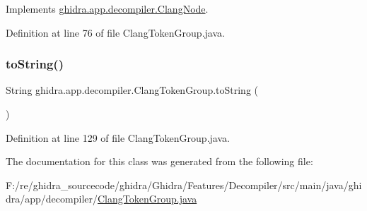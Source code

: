 Implements \mbox{\hyperlink{interfaceghidra_1_1app_1_1decompiler_1_1_clang_node_a4c8a1dc76211ce497441c58554675f55}{ghidra.\+app.\+decompiler.\+Clang\+Node}}.



Definition at line 76 of file Clang\+Token\+Group.\+java.

\mbox{\label{classghidra_1_1app_1_1decompiler_1_1_clang_token_group_a3aac53106263a74cda840c5bea1be90f}} 
\subsubsection{\texorpdfstring{toString()}{toString()}}
{\footnotesize\ttfamily String ghidra.\+app.\+decompiler.\+Clang\+Token\+Group.\+to\+String (\begin{DoxyParamCaption}{ }\end{DoxyParamCaption})\hspace{0.3cm}{\ttfamily [inline]}}



Definition at line 129 of file Clang\+Token\+Group.\+java.



The documentation for this class was generated from the following file\+:\begin{DoxyCompactItemize}
\item 
F\+:/re/ghidra\+\_\+sourcecode/ghidra/\+Ghidra/\+Features/\+Decompiler/src/main/java/ghidra/app/decompiler/\mbox{\hyperlink{_clang_token_group_8java}{Clang\+Token\+Group.\+java}}\end{DoxyCompactItemize}

